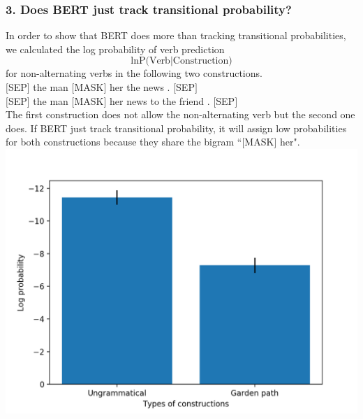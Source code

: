 \documentclass[twocolumn,dvipdfmx, 10pt]{article}
\begin{document}
\subsubsection*{3. Does BERT just track transitional probability?}
In order to show that BERT does more than tracking transitional probabilities, we calculated the log probability of verb prediction
$$\text{ln}\text{P(Verb} | \text{Construction)}$$
for non-alternating verbs in the following two constructions.\\
$[$SEP$]$ the man $[$MASK$]$ her the news . $[$SEP$]$\\
$[$SEP$]$ the man $[$MASK$]$ her news to the friend . $[$SEP$]$\\
The first construction does not allow the non-alternating verb but the second one does.  If BERT just track transitional probability, it will assign low probabilities for both constructions because they share the bigram ``$[$MASK$]$ her".\\
\includegraphics[keepaspectratio,width = \linewidth]{transition_prob.png}
\end{document}
